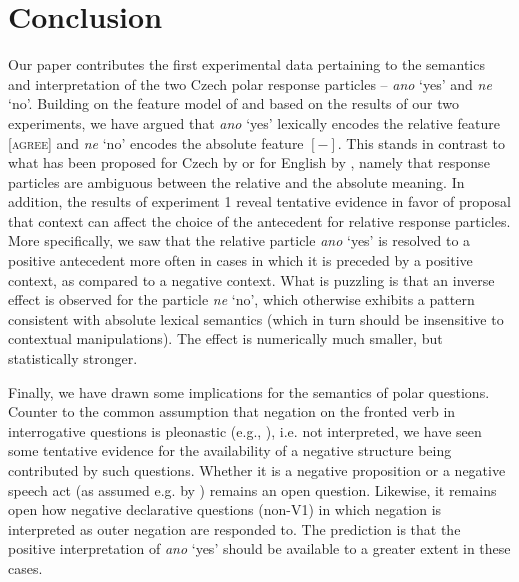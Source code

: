 \documentclass[output=paper,colorlinks,citecolor=brown]{langscibook}
\begin{document}

\section{Conclusion} \label{hrdsim:sec:conclusion}

Our paper contributes the first experimental data pertaining to the semantics and interpretation of the two Czech polar response particles -- \textit{ano} `yes' and \textit{ne} `no'. Building on the feature model of \citet{roelofsen-farkas15} and based on the results of our two experiments, we have argued that \textit{ano} `yes' lexically encodes the relative feature \textsc{[agree]} and \textit{ne} `no' encodes the absolute feature $[-]$. This stands in contrast to what has been proposed for Czech by \citet{gruet2016yes} or for English by \citet{roelofsen-farkas15}, namely that response particles are ambiguous between the relative and the absolute meaning. In addition, the results of experiment 1 reveal tentative evidence in favor of  proposal that context can affect the choice of the antecedent for relative response particles. More specifically, we saw that the relative particle \textit{ano} `yes' is resolved to a positive antecedent more often in cases in which it is preceded by a positive context, as compared to a negative context. What is puzzling is that an inverse effect is observed for the particle \textit{ne} `no', which otherwise exhibits a pattern consistent with absolute lexical semantics (which in turn should be insensitive to contextual manipulations). The effect is numerically much smaller, but statistically stronger.

Finally, we have drawn some implications for the semantics of polar questions. Counter to the common assumption that negation on the fronted verb in interrogative questions is pleonastic (e.g., \citealt{gruet2016yes}), i.e. not interpreted, we have seen some tentative evidence for the availability of a negative structure being contributed by such questions. Whether it is a negative proposition or a negative speech act (as assumed e.g. by \citealt{Stankova2023}) remains an open question. Likewise, it remains open how negative declarative questions (non-V1) in which negation is interpreted as outer negation \citep{Stankova2023} are responded to. The prediction is that the positive interpretation of \textit{ano} `yes' should be available to a greater extent in these cases.
\end{document}
